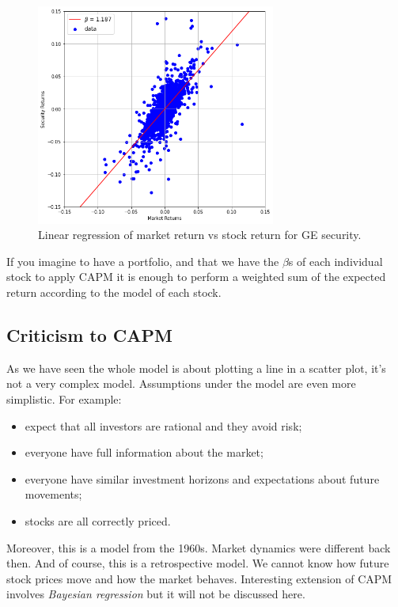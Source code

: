 \begin{figure}[htbp]
\centering
\includegraphics[width=0.7\textwidth]{figures/capm_fit}
\caption{Linear regression of market return vs stock return for GE security.}
\label{fig:capm_fit}
\end{figure}

If you imagine to have a portfolio, and that we have the $\beta$s of each individual stock to apply CAPM it is enough to perform a weighted sum of the expected return according to the model of each stock.

\subsection{Criticism to CAPM}
As we have seen the whole model is about plotting a line in a scatter plot, it’s not a very complex model. Assumptions under the model are even more simplistic. For example:
\begin{itemize}
\tightlist
\item expect that all investors are rational and they avoid risk;
\item everyone have full information about the market;
\item everyone have similar investment horizons and expectations about future movements;
\item stocks are all correctly priced.
\end{itemize}

Moreover, this is a model from the 1960s. Market dynamics were different back then. And of course, this is a retrospective model. We cannot know how future stock prices move and how the market behaves.
Interesting extension of CAPM involves \emph{Bayesian regression}\cite{bib:bayesian_regression} but it will not be discussed here.

